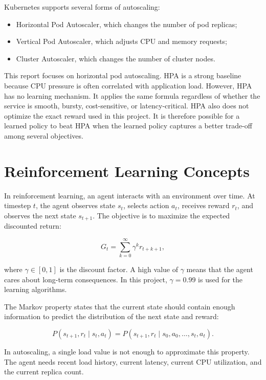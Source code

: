 \documentclass{rapportINPTCLOUD}
\begin{document}
Kubernetes supports several forms of autoscaling:

\begin{itemize}
  \item Horizontal Pod Autoscaler, which changes the number of pod replicas;
  \item Vertical Pod Autoscaler, which adjusts CPU and memory requests;
  \item Cluster Autoscaler, which changes the number of cluster nodes.
\end{itemize}

This report focuses on horizontal pod autoscaling. HPA is a strong baseline because CPU pressure is often correlated with application load. However, HPA has no learning mechanism. It applies the same formula regardless of whether the service is smooth, bursty, cost-sensitive, or latency-critical. HPA also does not optimize the exact reward used in this project. It is therefore possible for a learned policy to beat HPA when the learned policy captures a better trade-off among several objectives.

\section{Reinforcement Learning Concepts}

In reinforcement learning, an agent interacts with an environment over time. At timestep $t$, the agent observes state $s_t$, selects action $a_t$, receives reward $r_t$, and observes the next state $s_{t+1}$. The objective is to maximize the expected discounted return:

\begin{equation}
G_t =
\sum_{k=0}^{\infty} \gamma^k r_{t+k+1},
\label{eq:return}
\end{equation}

where $\gamma \in [0,1]$ is the discount factor. A high value of $\gamma$ means that the agent cares about long-term consequences. In this project, $\gamma=0.99$ is used for the learning algorithms.

The Markov property states that the current state should contain enough information to predict the distribution of the next state and reward:

\begin{equation}
P(s_{t+1},r_t \mid s_t,a_t)
=
P(s_{t+1},r_t \mid s_0,a_0,\ldots,s_t,a_t).
\end{equation}

In autoscaling, a single load value is not enough to approximate this property. The agent needs recent load history, current latency, current CPU utilization, and the current replica count.
\end{document}
